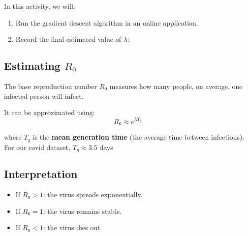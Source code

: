 \documentclass[11pt]{article}
\begin{document}
\medskip


In this activity, we will:

\begin{enumerate}
    \item Run the gradient descent algorithm in an online application.
    \item Record the final estimated value of $\lambda$:
\end{enumerate}

\subsection*{Estimating $R_0$}

The base reproduction number $R_0$ measures how many people, on average, one infected person will infect.

It can be approximated using:
\[
R_0 \approx e^{\lambda T_g}
\]

where $T_g$ is the \textbf{mean generation time} (the average time between infections). For our covid dataset, $T_g \approx 3.5$ days

\medskip




\subsection*{Interpretation}

\begin{itemize}
    \item If $R_0 > 1$: the virus spreads exponentially.
    \item If $R_0 = 1$: the virus remains stable.
    \item If $R_0 < 1$: the virus dies out.
\end{itemize}

\medskip
{}
\end{document}
